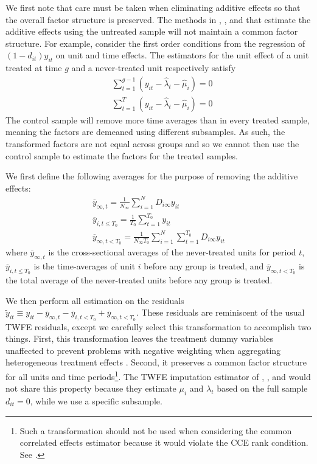\documentclass[12pt]{article}
\begin{document}
We first note that care must be taken when eliminating additive effects so that the overall factor structure is preserved. The methods in \citet{Borusyak_Jaravel_Spiess_2021}, \citet{Gardner_2021}, and \cite{Wooldridge_2021} that estimate the additive effects using the untreated sample will not maintain a common factor structure. For example, consider the first order conditions from the regression of $(1 - d_{it})y_{it}$ on unit and time effects. The estimators for the unit effect of a unit treated at time $g$ and a never-treated unit respectively satisfy
\begin{align}
  &\sum_{t = 1}^{g-1} (y_{it} - \widehat{\lambda}_t - \widehat{\mu}_i) = 0\\
  &\sum_{t = 1}^T (y_{it} - \widehat{\lambda}_t - \widehat{\mu}_i) = 0
\end{align}
The control sample will remove more time averages than in every treated sample, meaning the factors are demeaned using different subsamples. As such, the transformed factors are not equal across groups and so we cannot then use the control sample to estimate the factors for the treated samples. 

We first define the following averages for the purpose of removing the additive effects:
\begin{gather}
  \overline{y}_{\infty , t} = \frac{1}{N_{\infty}} \sum_{i = 1}^N D_{i \infty} y_{it} \\
  \overline{y}_{i,t\leq T_0} = \frac{1}{T_0} \sum_{t = 1}^{T_0} y_{it} \\
  \overline{y}_{\infty, t < T_0} = \frac{1}{N_{\infty} T_0} \sum_{i = 1}^N \sum_{t = 1}^{T_0} D_{i \infty} y_{it}
\end{gather}
where $\overline{y}_{\infty , t}$ is the cross-sectional averages of the never-treated units for period $t$, $\overline{y}_{i,t\leq T_0}$ is the time-averages of unit $i$ before any group is treated, and $\overline{y}_{\infty, t < T_0}$ is the total average of the never-treated units before any group is treated.

We then perform all estimation on the residuals $\tilde{y}_{it} \equiv y_{it} - \overline{y}_{\infty, t} - \overline{y}_{i,t < T_0} + \overline{y}_{\infty, t < T_0}$. These residuals are reminiscent of the usual TWFE residuals, except we carefully select this transformation to accomplish two things. First, this transformation leaves the treatment dummy variables unaffected to prevent problems with negative weighting when aggregating heterogeneous treatment effects \citep{Goodman-Bacon_2021,Borusyak_Jaravel_Spiess_2021}. Second, it preserves a common factor structure for all units and time periods\footnote{Such a transformation should not be used when considering the common correlated effects estimator because it would violate the CCE rank condition. See \citet{Brown_Butts_Westerlund_2023}.}. The TWFE imputation estimator of \citet{Gardner_2021}, \citet{Wooldridge_2021}, and \citet{Borusyak_Jaravel_Spiess_2021} would not share this property because they estimate $\mu_i$ and $\lambda_t$ based on the full sample $d_{it} = 0$, while we use a specific subsample.
\end{document}
